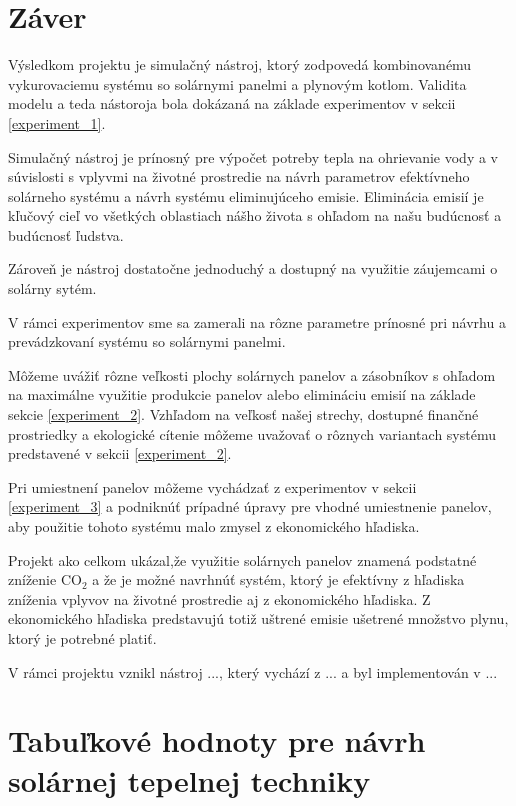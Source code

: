 \documentclass[a4paper, 11pt]{article}
\begin{document}
\section{Záver}
Výsledkom projektu je simulačný nástroj, ktorý zodpovedá kombinovanému vykurovaciemu systému so solárnymi panelmi a plynovým kotlom. Validita modelu a teda nástoroja bola dokázaná na základe experimentov v sekcii \ref{experiment_1}.

Simulačný nástroj je prínosný pre výpočet potreby tepla na ohrievanie vody a v súvislosti s vplyvmi na životné prostredie na návrh parametrov efektívneho solárneho systému a návrh systému eliminujúceho emisie. Eliminácia emisií je kľučový cieľ vo všetkých oblastiach nášho života s ohľadom na našu budúcnosť a budúcnosť ľudstva. 

Zároveň je nástroj dostatočne jednoduchý a dostupný na využitie záujemcami o solárny sytém.

V rámci experimentov sme sa zamerali na rôzne parametre prínosné pri návrhu a prevádzkovaní systému so solárnymi panelmi. 

Môžeme uvážiť rôzne veľkosti plochy solárnych panelov a zásobníkov s ohľadom na maximálne využitie produkcie panelov alebo elimináciu emisií na základe sekcie \ref{experiment_2}. Vzhľadom na veľkosť našej strechy, dostupné finančné prostriedky a ekologické cítenie môžeme uvažovať o rôznych variantach systému predstavené v sekcii \ref{experiment_2}.

Pri umiestnení panelov môžeme vychádzať z experimentov v sekcii \ref{experiment_3} a podniknúť prípadné úpravy pre vhodné umiestnenie panelov, aby použitie tohoto systému malo zmysel z ekonomického hľadiska.

Projekt ako celkom ukázal,že využitie solárnych panelov znamená podstatné zníženie CO$_2$ a že je možné navrhnúť systém, ktorý je efektívny z hľadiska zníženia vplyvov na životné prostredie aj z ekonomického hľadiska.
Z ekonomického hľadiska predstavujú totiž uštrené emisie ušetrené množstvo plynu, ktorý je potrebné platiť.

V rámci projektu vznikl nástroj ..., který vychází z ... a byl implementován v ...


\newpage



\newpage
\appendix

\section{Tabuľkové hodnoty pre návrh solárnej tepelnej techniky}\label{tabulky}
\end{document}
